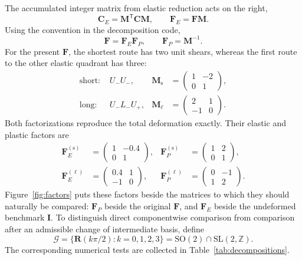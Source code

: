 \documentclass[11pt]{article}
\newcommand{\trans}{\mathsf{T}}
\newcommand{\shortp}{\mathrm{s}}
\newcommand{\longp}{\ell}
\newcommand{\SO}{\mathrm{SO}(2)}
\newcommand{\SLZ}{\mathrm{SL}(2,\mathbb{Z})}
\newcommand{\Uminus}{U_{-}}
\newcommand{\Lminus}{L_{-}}
\newcommand{\Uplus}{U_{+}}
\begin{document}
The accumulated integer matrix from elastic reduction acts on the right,
\begin{equation}
 \mathbf C_E=\mathbf M^\trans\mathbf C\mathbf M,
 \qquad
 \mathbf F_E=\mathbf F\mathbf M.
\end{equation}
Using the convention in the decomposition code,
\begin{equation}
 \boxed{
 \mathbf F=\mathbf F_E\mathbf F_P,
 \qquad
 \mathbf F_P=\mathbf M^{-1}.}
 \label{eq:decomposition}
\end{equation}
For the present \(\mathbf F\), the shortest route has two unit shears,
whereas the first route to the other elastic quadrant has three:
\begin{align}
 \text{short: }&\Uminus\Uminus,
 &\mathbf M_{\shortp}&=
 \begin{pmatrix}1&-2\\0&1\end{pmatrix},
 \\
 \text{long: }&\Uminus\Lminus\Uplus,
 &\mathbf M_{\longp}&=
 \begin{pmatrix}2&1\\-1&0\end{pmatrix}.
\end{align}
Both factorizations reproduce the total deformation exactly.  Their elastic
and plastic factors are
\begin{align}
 \mathbf F_E^{(\shortp)}&=
 \begin{pmatrix}1&-0.4\\0&1\end{pmatrix},
 &
 \mathbf F_P^{(\shortp)}&=
 \begin{pmatrix}1&2\\0&1\end{pmatrix},
 \\
 \mathbf F_E^{(\longp)}&=
 \begin{pmatrix}0.4&1\\-1&0\end{pmatrix},
 &
 \mathbf F_P^{(\longp)}&=
 \begin{pmatrix}0&-1\\1&2\end{pmatrix}.
\end{align}
Figure~\ref{fig:factors} puts these factors beside the matrices to which they
should naturally be compared: \(\mathbf F_P\) beside the original
\(\mathbf F\), and \(\mathbf F_E\) beside the undeformed benchmark
\(\mathbf I\).  To distinguish direct componentwise comparison from comparison
after an admissible change of intermediate basis, define
\begin{equation}
 \mathcal G=\{\mathbf R(k\pi/2):k=0,1,2,3\}
 =\SO\cap\SLZ.
 \label{eq:latticegroup}
\end{equation}
The corresponding numerical tests are collected in
Table~\ref{tab:decompositions}.
\end{document}
